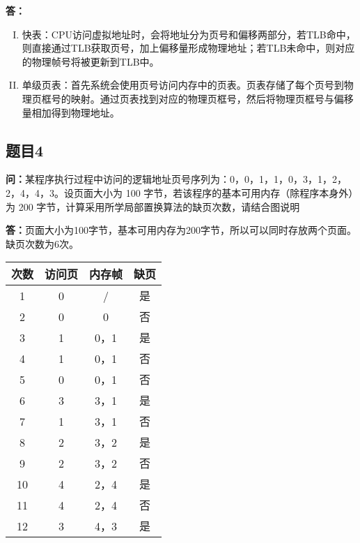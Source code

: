 \documentclass[12pt,hyperref,a4paper,UTF8]{ctexart}
\begin{document}
\textbf{答：}
\begin{enumerate}[I.]
    \item 快表：CPU访问虚拟地址时，会将地址分为页号和偏移两部分，若TLB命中，则直接通过TLB获取页号，加上偏移量形成物理地址；若TLB未命中，则对应的物理帧号将被更新到TLB中。
    \item 单级页表：首先系统会使用页号访问内存中的页表。页表存储了每个页号到物理页框号的映射。通过页表找到对应的物理页框号，然后将物理页框号与偏移量相加得到物理地址。
\end{enumerate}

\subsection{题目4}
\textbf{问：}某程序执行过程中访问的逻辑地址页号序列为：0，0，1，1，0，3，1，2，2，4，4，3。设页面大小为 100 字节，若该程序的基本可用内存（除程序本身外）为 200 字节，计算采用所学局部置换算法的缺页次数，请结合图说明

\textbf{答：}页面大小为100字节，基本可用内存为200字节，所以可以同时存放两个页面。缺页次数为6次。

\begin{table}[ht!]\label{tab-1}
    \centering
 
    \begin{tabular}{c|c|c|c}
        \toprule
        次数& 访问页 & 内存帧 & 缺页 \\
        \midrule
        1 & 0 & / & 是 \\
        2 & 0 & 0 & 否 \\
        3 & 1 & 0，1 & 是 \\
        4 & 1 & 0，1 & 否 \\
        5 & 0 & 0，1 & 否\\
        6 & 3 & 3，1 & 是 \\
        7 & 1 & 3，1 & 否 \\
        8 & 2 & 3，2 & 是 \\
        9 & 2 & 3，2 & 否 \\
        10 & 4 & 2，4 & 是 \\
        11 & 4 & 2，4 & 否 \\
        12 & 3 & 4，3 & 是 \\
        \bottomrule
    \end{tabular}
    
\end{table}
\end{document}
